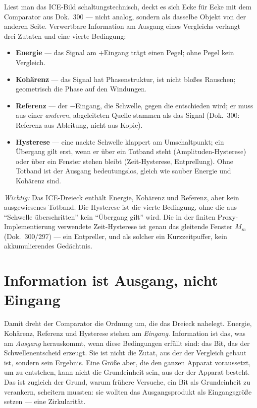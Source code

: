 Liest man das ICE-Bild schaltungstechnisch, deckt es sich Ecke für Ecke mit
dem Comparator aus Dok.~300 --- nicht analog, sondern als dasselbe Objekt von
der anderen Seite. Verwertbare Information am Ausgang eines Vergleichs verlangt
drei Zutaten und eine vierte Bedingung:
\begin{itemize}
  \item \textbf{Energie} --- das Signal am $+$Eingang trägt einen Pegel;
    ohne Pegel kein Vergleich.
  \item \textbf{Kohärenz} --- das Signal hat Phasenstruktur, ist nicht bloßes
    Rauschen; geometrisch die Phase auf den Windungen.
  \item \textbf{Referenz} --- der $-$Eingang, die Schwelle, gegen die
    entschieden wird; er muss aus einer \emph{anderen}, abgeleiteten Quelle
    stammen als das Signal (Dok.~300: Referenz aus Ableitung, nicht aus Kopie).
  \item \textbf{Hysterese} --- eine nackte Schwelle klappert am Umschaltpunkt;
    ein Übergang gilt erst, wenn er über ein Totband steht (Amplituden-Hysterese)
    oder über ein Fenster stehen bleibt (Zeit-Hysterese, Entprellung).
    Ohne Totband ist der Ausgang bedeutungslos, gleich wie sauber Energie und
    Kohärenz sind.
\end{itemize}
\emph{Wichtig:} Das ICE-Dreieck enthält Energie, Kohärenz und Referenz, aber
kein ausgewiesenes Totband. Die Hysterese ist die vierte Bedingung, ohne die
aus \enquote{Schwelle überschritten} kein \enquote{Übergang gilt} wird. Die in
der finiten Proxy-Implementierung verwendete Zeit-Hysterese ist genau das
gleitende Fenster $M_m$ (Dok.~300/297) --- ein Entpreller, und als solcher ein
Kurzzeitpuffer, kein akkumulierendes Gedächtnis.

\section{Information ist Ausgang, nicht Eingang}

Damit dreht der Comparator die Ordnung um, die das Dreieck nahelegt. Energie,
Kohärenz, Referenz und Hysterese stehen am \emph{Eingang}. Information ist das,
was am \emph{Ausgang} herauskommt, wenn diese Bedingungen erfüllt sind: das
Bit, das der Schwellenentscheid erzeugt. Sie ist nicht die Zutat, aus der der
Vergleich gebaut ist, sondern sein Ergebnis. Eine Größe aber, die den ganzen
Apparat voraussetzt, um zu entstehen, kann nicht die Grundeinheit sein, aus der
der Apparat besteht. Das ist zugleich der Grund, warum frühere Versuche, ein
Bit als Grundeinheit zu verankern, scheitern mussten: sie wollten das
Ausgangsprodukt als Eingangsgröße setzen --- eine Zirkularität.


